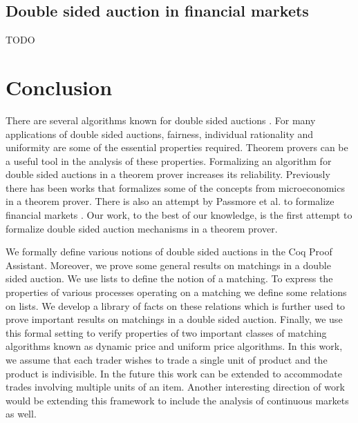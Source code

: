 \documentclass[a4paper,UKenglish,cleveref, autoref]{lipics-v2019}
\begin{document}
\subsection{Double sided auction in financial markets}
TODO

\section{Conclusion}\label{sec:conclusion}
There are several algorithms known for double sided auctions \cite{Deshmukh:2002:TCD}. For many applications of double sided auctions, fairness, individual rationality and uniformity are some of the essential properties required. Theorem provers can be a useful tool in the analysis of these properties. Formalizing an algorithm for double sided auctions in a theorem prover increases its reliability. Previously there has been works that formalizes some of the concepts from microeconomics \cite{toolbox,welfare} in a theorem prover. There is also an  attempt by Passmore et al. to formalize financial markets \cite{PassmoreI17}. Our work, to the best of our knowledge, is the first attempt to formalize double sided auction mechanisms in a theorem prover.

We formally define various notions of double sided auctions in the Coq Proof Assistant.
Moreover, we prove some general results on matchings in a double sided auction. We use
lists to define the notion of a matching. To express the properties
of various processes operating on a matching we define some relations on lists. We develop a library of facts on these relations which is further used to prove
important results on matchings in a double sided auction. Finally, we use this formal setting
to verify properties of two important classes of matching algorithms known as dynamic price
and uniform price algorithms. In this work, we assume that each trader wishes
to trade a single unit of product and the product is indivisible. In the future this work can be
extended to accommodate trades involving multiple units of an item. Another interesting direction of work
would be extending this framework to include the analysis of continuous markets as well.


\end{document}
